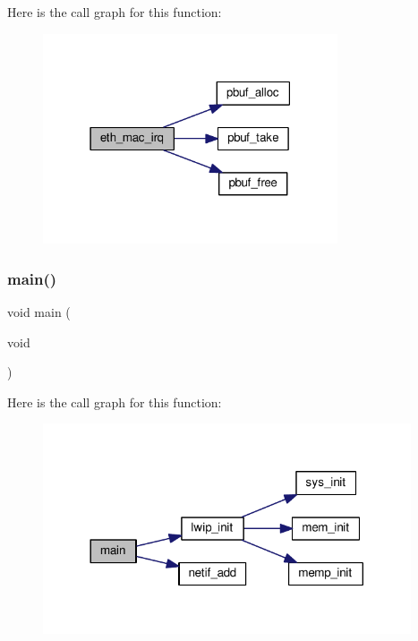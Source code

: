 Here is the call graph for this function\+:
\nopagebreak
\begin{figure}[H]
\begin{center}
\leavevmode
\includegraphics[width=247pt]{openmote-cc2538_2lwip_2doc_2NO__SYS__SampleCode_8c_aa86345e2411c6c283cae728f797c4b94_cgraph}
\end{center}
\end{figure}
\mbox{\label{openmote-cc2538_2lwip_2doc_2NO__SYS__SampleCode_8c_a6288eba0f8e8ad3ab1544ad731eb7667}} 
\subsubsection{\texorpdfstring{main()}{main()}}
{\footnotesize\ttfamily void main (\begin{DoxyParamCaption}\item[{void}]{ }\end{DoxyParamCaption})}

Here is the call graph for this function\+:
\nopagebreak
\begin{figure}[H]
\begin{center}
\leavevmode
\includegraphics[width=308pt]{openmote-cc2538_2lwip_2doc_2NO__SYS__SampleCode_8c_a6288eba0f8e8ad3ab1544ad731eb7667_cgraph}
\end{center}
\end{figure}
